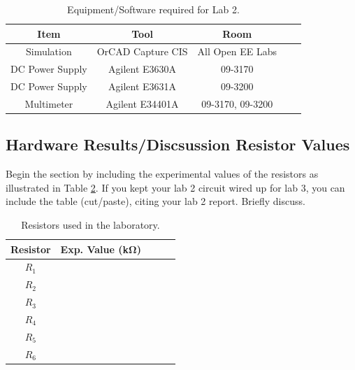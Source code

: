 \documentclass[11pt]{article}
\begin{document}
		\begin{table}[h!]
			\centering
			\caption{Equipment/Software required for Lab 2.}
			\label{Table:Equipment}
			\begin{tabular}{|c||c|c|c|c|}
				\hline
				Item & Tool & Room      \\
				\hline
				Simulation & OrCAD Capture CIS & All Open EE Labs   \\	 
				\hline 
				DC Power Supply&  Agilent E3630A  & 09-3170   \\	
				\hline  
				DC Power Supply & Agilent E3631A   & 09-3200 \\ 
				\hline 
				Multimeter & Agilent E34401A   & 09-3170, 09-3200 \\ 
				\hline 
			\end{tabular}
		\end{table}
\subsection{Hardware Results/Discsussion Resistor Values}	
  Begin the section by including the experimental values of the resistors as illustrated in Table \ref{Table:Lab3Resistors}. If you kept your lab 2 circuit wired up for lab 3, you can include the table (cut/paste), citing your lab 2 report. Briefly discuss.
  	\begin{table}[h!]
  		\centering
  		\caption{Resistors used in the laboratory.}
  		\label{Table:Lab3Resistors}
  		\begin{tabular}{|c||c|c|c|c|}
  			\hline
  			Resistor &Exp. Value (\si{\kilo\ohm})  \\
  			\hline
  			$R_{1}$  &   \\	 \hline 
  			$R_{2}$  & \\	 \hline 
  			$R_{3}$  & \\	 \hline 
  			$R_{4}$  & \\	 \hline 
  			$R_{5}$  & \\	 \hline 
  			$R_{6}$  &  \\	 \hline
  		\end{tabular}
  	\end{table}
\end{document}
